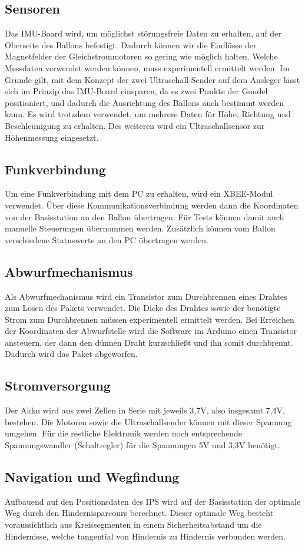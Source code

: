 \documentclass[lang=ngerman,inputenc=utf8,fontsize=10pt]{ldvarticle}
\begin{document}
\subsection*{Sensoren}
Das IMU-Board wird, um möglichst störungsfreie Daten zu erhalten, auf der Oberseite des Ballons befestigt. Dadurch können wir die Einflüsse der Magnetfelder der Gleichstrommotoren so gering wie möglich halten. Welche Messdaten verwendet werden können, muss experimentell ermittelt werden. Im Grunde gilt, mit dem Konzept der zwei Ultraschall-Sender auf dem Ausleger lässt sich im Prinzip das IMU-Board einsparen, da es zwei Punkte der Gondel positioniert, und dadurch die Ausrichtung des Ballons auch bestimmt werden kann. Es wird trotzdem verwendet, um mehrere Daten für Höhe, Richtung und Beschleunigung zu erhalten. Des weiteren wird ein Ultraschallsensor zur Höhenmessung eingesetzt.
\subsection*{Funkverbindung}
Um eine Funkverbindung mit dem PC zu erhalten, wird ein XBEE-Modul verwendet. Über diese Kommunikationsverbindung werden dann die Koordinaten von der Basisstation an den Ballon übertragen. Für Tests können damit auch manuelle Steuerungen übernommen werden. Zusätzlich können vom Ballon verschiedene Statuswerte an den PC übertragen werden.
\subsection*{Abwurfmechanismus}
Als Abwurfmechanismus wird ein Transistor zum Durchbrennen eines Drahtes zum Lösen des Pakets verwendet. Die Dicke des Drahtes sowie der benötigte Strom zum Durchbrennen müssen experimentell ermittelt werden. Bei Erreichen der Koordinaten der Abwurfstelle wird die Software im Arduino einen Transistor ansteuern, der dann den dünnen Draht kurzschließt und ihn somit durchbrennt. Dadurch wird das Paket abgeworfen.
\subsection*{Stromversorgung}
Der Akku wird aus zwei Zellen in Serie mit jeweils 3,7V, also insgesamt 7,4V, bestehen. Die Motoren sowie die Ultraschallsender können mit dieser Spannung umgehen. Für die restliche Elektronik werden noch entsprechende Spannungswandler (Schaltregler) für die Spannungen 5V und 3,3V benötigt.
\subsection*{Navigation und Wegfindung}
Aufbauend auf den Positionsdaten des IPS wird auf der Basisstation der optimale Weg durch den Hindernisparcours berechnet. Dieser optimale Weg besteht voraussichtlich aus Kreissegmenten in einem Sicherheitsabstand um die Hindernisse, welche tangential von Hindernis zu Hindernis verbunden werden.
\end{document}
